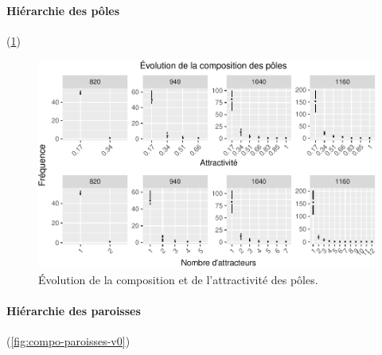 \paragraph{Hiérarchie des pôles}

\begin{mdframed}[backgroundcolor=gray!10,footnoteinside=false]
	(\cref{fig:compo-poles-v0})
\end{mdframed}

\begin{figure}[H]
	\captionsetup{width=\linewidth}
	\includegraphics[width=\linewidth]{img/resultats/v0_compo_poles.pdf}
	\caption{Évolution de la composition et de l'attractivité des pôles.} 
	\label{fig:compo-poles-v0} 
\end{figure}

\paragraph{Hiérarchie des paroisses}

\begin{mdframed}[backgroundcolor=gray!10,footnoteinside=false]
	(\cref{fig:compo-paroisses-v0})
\end{mdframed}

